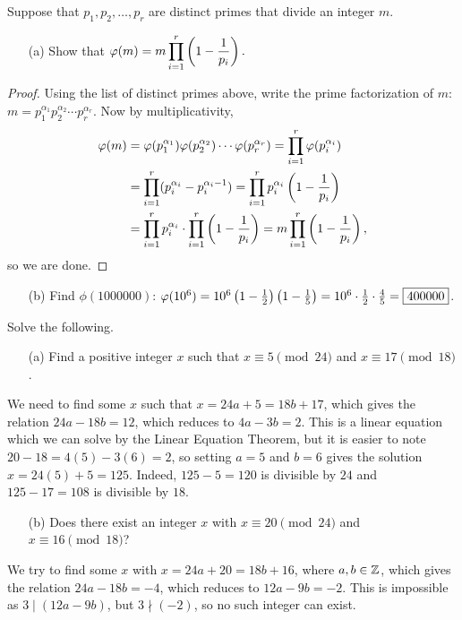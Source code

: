 \documentclass{article}
\begin{document}
\begin{exercise}[Chapter 11, \#3]
Suppose that $p_1, p_2, \ldots, p_r$ are distinct primes that divide an integer $m$. 

\begin{itemize}
    \item[(a)] Show that $\displaystyle\varphi(m) = m\prod_{i=1}^r \left(1 - \frac 1{p_i} \right).$
\end{itemize}
\begin{proof}
Using the list of distinct primes above, write the prime factorization of $m$: $m = p_1^{\alpha_1} p_2^{\alpha_2} \cdots p_r^{\alpha_r}$. Now by multiplicativity,
\begin{align*}
    \varphi(m) &= \varphi(p_1^{\alpha_1}) \varphi(p_2^{\alpha_2}) \cdots \varphi(p_r^{\alpha_r}) = \prod_{i=1}^r \varphi(p_i^{\alpha_i}) \\
    &= \prod_{i=1}^r (p_i^{\alpha_i} - p_i^{\alpha_i - 1}) = \prod_{i=1}^r p_i^{\alpha_i}\left(1 - \frac 1{p_i} \right)\\
    &= \prod_{i=1}^r p_i^{\alpha_i} \cdot \prod_{i=1}^r \left(1 - \frac 1{p_i} \right) = m\prod_{i=1}^r \left(1 - \frac 1{p_i} \right),
\end{align*}
so we are done.
\end{proof}

\begin{itemize}
    \item[(b)] Find $\phi(1000000)$:  $\varphi(10^6) = 10^6\left(1 - \frac 12 \right)\left(1 - \frac 15 \right) = 10^6\cdot \frac 12\cdot \frac 45 = \boxed{400000}$.
\end{itemize}
\end{exercise}
\begin{exercise}
Solve the following.
\begin{itemize}
    \item[(a)] Find a positive integer $x$ such that $x\equiv 5\pmod{24}$ and $x\equiv 17 \pmod{18}$.
\end{itemize}
\begin{solution}
We need to find some $x$ such that $x = 24a + 5 = 18b + 17$, which gives the relation $24a - 18b = 12$, which reduces to $4a - 3b = 2$. This is a linear equation which we can solve by the Linear Equation Theorem, but it is easier to note $20 - 18 = 4(5) - 3(6) = 2$, so setting $a =5$ and $b=6$ gives the solution $x = 24(5) + 5  = \boxed{125}$. Indeed, $125 - 5 = 120$ is divisible by $24$ and $125 - 17 = 108$ is divisible by $18$.
\end{solution}

\begin{itemize}
    \item[(b)] Does there exist an integer $x$ with $x\equiv 20\pmod{24}$ and $x\equiv 16\pmod{18}$?
\end{itemize}
\begin{solution}
We try to find some $x$ with $x = 24a + 20 = 18b + 16$, where $a,b\in \mathbb Z$, which gives the relation $24a - 18b = -4$, which reduces to $12a - 9b = -2$. This is impossible as $3\mid (12a - 9b)$, but $3\nmid (-2)$, so no such integer can exist.
\end{solution}
\end{exercise}
\end{document}
